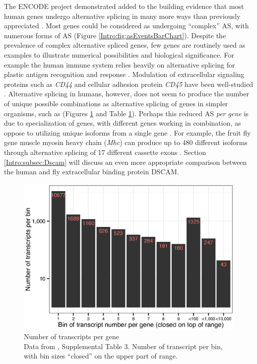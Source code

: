     The ENCODE project demonstrated added to the building evidence that most human genes undergo alternative splicing in many more ways than previously appreciated \citep{Wang2008,Pan2008}. Most genes could be considered as undergoing ``complex'' AS, with numerous forms of AS (Figure \ref{Intro:fig:asEventsBarChart}). Despite the prevalence of complex alternative spliced genes, few genes are routinely used as examples to illustrate numerical possibilities and biological significance. For example the human immune system relies heavily on alternative splicing for plastic antigen recognition and response \citep{Lynch2004}. Modulation of extracellular signaling proteins such as \textit{CD44} and cellular adhesion protein \textit{CD45} have been well-studied \citep{Zikherman2008,Ponta2003}. Alternative splicing in humans, however, does not seem to produce the number of unique possible combinations as alternative splicing of genes in simpler organisms, such as \flies{} (Figures \ref{Intro:fig:txPerFlyGene} and Table \ref{Intro:fig:txPerFlyGene}). Perhaps this reduced AS \textit{per gene} is due to specialization of genes, with different genes working in combination, as oppose to utilizing unique isoforms from a single gene \citep{Park2007}. For example, the fruit fly gene muscle myosin heavy chain (\textit{Mhc}) can produce up to 480 different isoforms through alternative splicing of 17 different cassette exons \citep{Bernstein1983a}. Section \ref{Intro:subsec:Dscam} will discuss an even more appropriate comparison between the human and fly extracellular binding protein DSCAM.

    \begin{figure} %
      \centering 
      \includegraphics{Figures/Intro/NumberOFTranscriptsPerFlyGene.eps}
      \caption[Number of transcripts per \flies{} gene]
      {
        Number of transcripts per \flies{} gene\\[0.25cm]
        Data from \citep{Brown2014}, Supplemental Table 3. Number of transcript per bin, with bin sizes ``closed'' on the upper part of range.
        }
      \label{Intro:fig:txPerFlyGene}
      \end{figure}

